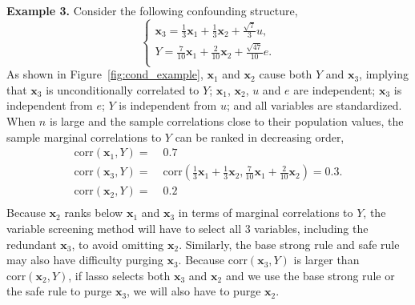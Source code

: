 \documentclass[11pt,review,authoryear]{elsarticle}
\begin{document}
\smallskip
\noindent
\textbf{Example 3.} Consider the following confounding structure,
%
\begin{equation}
	\begin{cases}
    \mathbf{x}_3 = \frac{1}{3} \mathbf{x}_1 + \frac{1}{3} \mathbf{x}_2 + \frac{\sqrt{7}}{3} u, \\
    Y = \frac{7}{10} \mathbf{x}_1 +  \frac{2}{10} \mathbf{x}_2 +  \frac{\sqrt{47}}{10} e. \\
	\end{cases}
	\label{eqn:example_4}
\end{equation}
%
As shown in Figure~\ref{fig:cond_example}, $\mathbf{x}_1$ and $\mathbf{x}_2$ cause both $Y$ and $\mathbf{x}_3$, implying that $\mathbf{x}_3$ is unconditionally correlated to $Y$; $\mathbf{x}_1$, $\mathbf{x}_2$, $u$ and $e$ are independent; $\mathbf{x}_3$ is independent from $e$; $Y$ is independent from $u$; and all variables are standardized. When $n$ is large and the sample correlations close to their population values, the sample marginal correlations to $Y$ can be ranked in decreasing order,
%
\begin{equation}
  \begin{aligned}
    \mathrm{corr} \left( \mathbf{x}_1, Y \right)  = & \;0.7 \\
    \mathrm{corr} \left( \mathbf{x}_3, Y \right)  = & \;\mathrm{corr} \left( \frac{1}{3} \mathbf{x}_1 + \frac{1}{3} \mathbf{x}_2, \frac{7}{10} \mathbf{x}_1 +  \frac{2}{10} \mathbf{x}_2 \right)
    = 0.3. \\
    \mathrm{corr} \left( \mathbf{x}_2, Y \right)  = & \;0.2 \\
  \end{aligned}
\end{equation}
%
Because $\mathbf{x}_2$ ranks below $\mathbf{x}_1$ and $\mathbf{x}_3$ in terms of marginal correlations to $Y$, the variable screening method will have to select all $3$ variables, including the redundant $\mathbf{x}_3$, to avoid omitting $\mathbf{x}_2$. Similarly, the base strong rule and safe rule may also have difficulty purging $\mathbf{x}_3$. Because $\mathrm{corr} \left( \mathbf{x}_3, Y \right)$ is larger than $\mathrm{corr} \left( \mathbf{x}_2, Y \right)$, if lasso selects both $\mathbf{x}_3$ and $\mathbf{x}_2$ and we use the base strong rule or the safe rule to purge $\mathbf{x}_3$, we will also have to purge $\mathbf{x}_2$.
\end{document}
